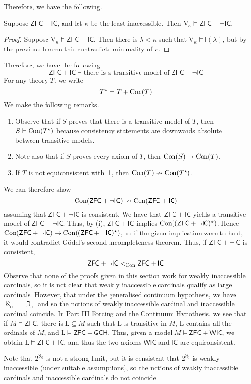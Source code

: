 Therefore, we have the following.
\begin{theorem}
    Suppose \( \mathsf{ZFC} + \mathsf{IC} \), and let \( \kappa \) be the least inaccessible.
    Then \( \mathrm{V}_\kappa \vDash \mathsf{ZFC} + \neg\mathsf{IC} \).
\end{theorem}
\begin{proof}
    Suppose \( \mathrm{V}_\kappa \vDash \mathsf{ZFC} + \mathsf{IC} \).
    Then there is \( \lambda < \kappa \) such that \( \mathrm{V}_\kappa \vDash \mathsf{I}(\lambda) \), but by the previous lemma this contradicts minimality of \( \kappa \).
\end{proof}
Therefore, we have the following.
\[ \mathsf{ZFC} + \mathsf{IC} \vdash \text{there is a transitive model of } \mathsf{ZFC} + \neg\mathsf{IC} \]
For any theory \( T \), we write
\[ T^\star = T + \operatorname{Con}(T) \]
We make the following remarks.
\begin{enumerate}
    \item Observe that if \( S \) proves that there is a transitive model of \( T \), then \( S \vdash \operatorname{Con}(T^\star) \) because consistency statements are downwards absolute between transitive models.
    \item Note also that if \( S \) proves every axiom of \( T \), then \( \operatorname{Con}(S) \to \operatorname{Con}(T) \).
    \item If \( T \) is not equiconsistent with \( \bot \), then \( \operatorname{Con}(T) \nrightarrow \operatorname{Con}(T^\star) \).
\end{enumerate}
We can therefore show
\[ \operatorname{Con}(\mathsf{ZFC} + \neg\mathsf{IC}) \nrightarrow \operatorname{Con}(\mathsf{ZFC} + \mathsf{IC}) \]
assuming that \( \mathsf{ZFC} + \neg\mathsf{IC} \) is consistent.
We have that \( \mathsf{ZFC} + \mathsf{IC} \) yields a transitive model of \( \mathsf{ZFC} + \neg\mathsf{IC} \).
Thus, by (i), \( \mathsf{ZFC} + \mathsf{IC} \) implies \( \operatorname{Con}((\mathsf{ZFC} + \neg\mathsf{IC})^\star) \).
Hence \( \operatorname{Con}(\mathsf{ZFC} + \neg\mathsf{IC}) \to \operatorname{Con}((\mathsf{ZFC} + \neg\mathsf{IC})^\star) \), so if the given implication were to hold, it would contradict G\"odel's second incompleteness theorem.
Thus, if \( \mathsf{ZFC} + \neg\mathsf{IC} \) is consistent,
\[ \mathsf{ZFC} + \neg\mathsf{IC} <_{\operatorname{Con}} \mathsf{ZFC} + \mathsf{IC} \]
Observe that none of the proofs given in this section work for weakly inaccessible cardinals, so it is not clear that weakly inaccessible cardinals qualify as large cardinals.
However, that under the generalised continuum hypothesis, we have \( \aleph_\alpha = \beth_\alpha \) and so the notions of weakly inaccessible cardinal and inaccessible cardinal coincide.
In Part III Forcing and the Continuum Hypothesis, we see that if \( M \vDash \mathsf{ZFC} \), there is \( \mathrm{L} \subseteq M \) such that \( \mathrm{L} \) is transitive in \( M \), \( \mathrm{L} \) contains all the ordinals of \( M \), and \( \mathrm{L} \vDash \mathsf{ZFC} + \mathsf{GCH} \).
Thus, given a model \( M \vDash \mathsf{ZFC} + \mathsf{WIC} \), we obtain \( \mathrm{L} \vDash \mathsf{ZFC} + \mathsf{IC} \), and thus the two axioms \( \mathsf{WIC} \) and \( \mathsf{IC} \) are equiconsistent.

Note that \( 2^{\aleph_0} \) is not a strong limit, but it is consistent that \( 2^{\aleph_0} \) is weakly inaccessible (under suitable assumptions), so the notions of weakly inaccessible cardinals and inaccessible cardinals do not coincide.
